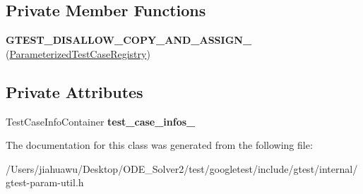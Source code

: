 \subsection*{Private Member Functions}
\begin{DoxyCompactItemize}
\item 
\mbox{\label{classtesting_1_1internal_1_1_parameterized_test_case_registry_ad4b492ca1c7f0cf14db6dde5f462644d}} 
{\bfseries G\+T\+E\+S\+T\+\_\+\+D\+I\+S\+A\+L\+L\+O\+W\+\_\+\+C\+O\+P\+Y\+\_\+\+A\+N\+D\+\_\+\+A\+S\+S\+I\+G\+N\+\_\+} (\mbox{\hyperlink{classtesting_1_1internal_1_1_parameterized_test_case_registry}{Parameterized\+Test\+Case\+Registry}})
\end{DoxyCompactItemize}
\subsection*{Private Attributes}
\begin{DoxyCompactItemize}
\item 
\mbox{\label{classtesting_1_1internal_1_1_parameterized_test_case_registry_a10be2f29d41be96c14d976f0cda3d0f7}} 
Test\+Case\+Info\+Container {\bfseries test\+\_\+case\+\_\+infos\+\_\+}
\end{DoxyCompactItemize}


The documentation for this class was generated from the following file\+:\begin{DoxyCompactItemize}
\item 
/\+Users/jiahuawu/\+Desktop/\+O\+D\+E\+\_\+\+Solver2/test/googletest/include/gtest/internal/gtest-\/param-\/util.\+h\end{DoxyCompactItemize}
